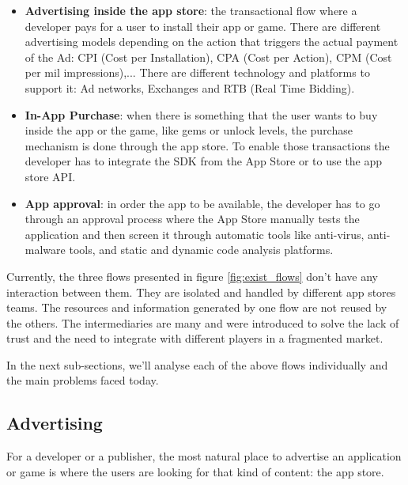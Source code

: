 \begin{itemize}
\item {\bf Advertising inside the app store}: the transactional flow where a developer pays for a user to install their app or game. There are different advertising models depending on the action that triggers the actual payment of the Ad: CPI (Cost per Installation), CPA (Cost per Action), CPM (Cost per mil impressions),... There are different technology and platforms to support it: Ad networks, Exchanges and RTB (Real Time Bidding).
\item {\bf In-App Purchase}: when there is something that the user wants to buy inside the app or the game, like gems or unlock levels, the purchase mechanism is done through the app store. To enable those transactions the developer has to integrate the SDK from the App Store or to use the app store API.
\item {\bf App approval}: in order the app to be available, the developer has to go through an approval process where the App Store manually tests the application and then screen it through automatic tools like anti-virus, anti-malware tools, and static and dynamic code analysis platforms.
\end{itemize}


Currently, the three flows presented in figure \ref{fig:exist_flows} don't have any interaction between them. They are isolated and handled by different app stores teams. The resources and information generated by one flow are not reused by the others. The intermediaries are many and were introduced to solve the lack of trust and the need to integrate with different players in a fragmented market.  



In the next sub-sections, we'll analyse each of the above flows individually and the main problems faced today.

\subsection{Advertising}

For a developer or a publisher, the most natural place to advertise an application or game is where the users are looking for that kind of content: the app store.

